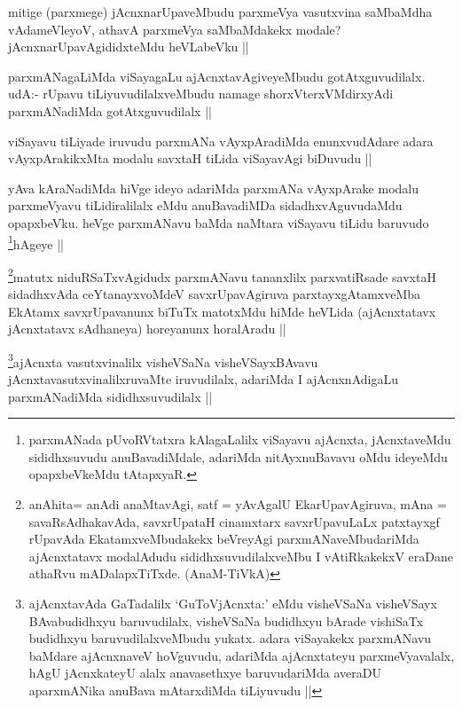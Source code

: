 \begin{artha}
mitige (parxmege) jAcnxnarUpaveMbudu parxmeVya vasutxvina saMbaMdha vAdameVleyoV, athavA parxmeVya saMbaMdakekx modale? jAcnxnarUpavAgididxteMdu heVLabeVku ||
\end{artha}

\begin{artha}
parxmANagaLiMda viSayagaLu ajAcnxtavAgiveyeMbudu gotAtxguvudilalx. udA:- rUpavu tiLiyuvudilalxveMbudu namage shorxVterxVMdirxyAdi parxmANadiMda gotAtxguvudilalx ||
\end{artha}

\begin{artha}
viSayavu tiLiyade iruvudu parxmANa vAyxpAradiMda enunxvudAdare adara vAyxpArakikxMta modalu savxtaH tiLida viSayavAgi biDuvudu ||
\end{artha}

\begin{artha}
yAva kAraNadiMda hiVge ideyo adariMda parxmANa vAyxpArake modalu parxmeVyavu tiLidiralilalx eMdu anuBavadiMDa sidadhxvAguvudaMdu opapxbeVku. heVge parxmANavu baMda naMtara viSayavu tiLidu baruvudo \footnote[1]{parxmANada pUvoRVtatxra kAlagaLalilx viSayavu ajAcnxta, jAcnxtaveMdu sididhxsuvudu anuBavadiMdale, adariMda nitAyxnuBavavu oMdu ideyeMdu opapxbeVkeMdu tAtapxyaR.}hAgeye ||
\end{artha}

\begin{artha}
\footnote[1]{anAhita= anAdi anaMtavAgi, satf = yAvAgalU EkarUpavAgiruva, mAna = savaRsAdhakavAda, savxrUpataH cinamxtarx savxrUpavuLaLx patxtayxgf rUpavAda EkatamxveMbudakekx beVreyAgi parxmANaveMbudariMda ajAcnxtatavx modalAdudu sididhxsuvudilalxveMbu I vAtiRkakekxV eraDane athaRvu mADalapxTiTxde. (AnaM-TiVkA)}matutx niduRSaTxvAgidudx parxmANavu tananxlilx parxvatiRsade savxtaH sidadhxvAda ceYtanayxvoMdeV savxrUpavAgiruva parxtayxgAtamxveMba EkAtamx savxrUpavanunx biTuTx matotxMdu hiMde heVLida (ajAcnxtatavx jAcnxtatavx sAdhaneya) horeyanunx horalAradu ||
\end{artha}

\begin{artha}
\footnote[2]{ajAcnxtavAda GaTadalilx `GuToVjAcnxta:' eMdu visheVSaNa visheVSayx BAvabudidhxyu baruvudilalx, visheVSaNa budidhxyu bArade vishiSaTx budidhxyu baruvudilalxveMbudu yukatx. adara viSayakekx parxmANavu baMdare ajAcnxnaveV hoVguvudu, adariMda ajAcnxtateyu parxmeVyavalalx, hAgU jAcnxkateyU alalx anavasethxye baruvudariMda averaDU aparxmANika anuBava mAtarxdiMda tiLiyuvudu ||}ajAcnxta vasutxvinalilx visheVSaNa visheVSayxBAvavu jAcnxtavasutxvinalilxruvaMte iruvudilalx, adariMda I ajAcnxnAdigaLu parxmANadiMda sididhxsuvudilalx ||
\end{artha}

